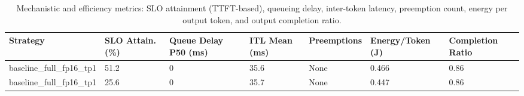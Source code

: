\begin{table}
\caption{Mechanistic and efficiency metrics: SLO attainment (TTFT-based), queueing delay, inter-token latency, preemption count, energy per output token, and output completion ratio.}
\label{tab:efficiency}
\begin{tabular}{lllllll}
\toprule
Strategy & SLO Attain. (\%) & Queue Delay P50 (ms) & ITL Mean (ms) & Preemptions & Energy/Token (J) & Completion Ratio \\
\midrule
baseline\_full\_fp16\_tp1 & 51.2 & 0 & 35.6 & None & 0.466 & 0.86 \\
baseline\_full\_fp16\_tp1 & 25.6 & 0 & 35.7 & None & 0.447 & 0.86 \\
\bottomrule
\end{tabular}
\end{table}
